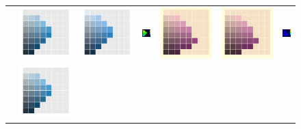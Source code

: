 \begin{figure}[ht!]
{\begin{tabular}{ccccccc}
			&\includegraphics[width=.15\linewidth]{img/results_uplift_page29_originalFL7.png}
			&
			\includegraphics[width=.15\linewidth]{img/results_uplift_page29_sigmoidFL7.png}
			& 
			\includegraphics[width=.15\linewidth,height=5.25em]{img/results_uplift_page29_diff_sigmoidFL7.png}
			&\quad
			\includegraphics[width=.15\linewidth]{img/results_uplift_page35_originalD50.png}
			&
			\includegraphics[width=.15\linewidth]{img/results_uplift_page35_sigmoidD50.png}
			&
			\includegraphics[width=.15\linewidth,height=5.25em]{img/results_uplift_page35_diff_sigmoidD50.png}
			\\ \raisebox{0.5cm}[0pt][0pt]{\parbox[c][0pt][c]{0cm}{\hspace{-1.5em}\\[20pt]}\par}
			&
			\includegraphics[width=.15\linewidth]{img/results_uplift_page29_originalFL7.png}

\end{tabular}}
\end{figure}
